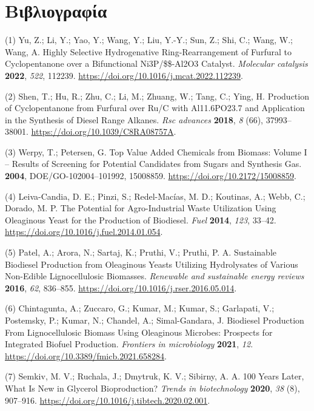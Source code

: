 \documentclass[11pt]{article}
\begin{document}
\pagebreak

\section{Βιβλιογραφία}
\label{sec:org909f14a}
\hypertarget{citeproc_bib_item_1}{(1) Yu, Z.; Li, Y.; Yao, Y.; Wang, Y.; Liu, Y.-Y.; Sun, Z.; Shi, C.; Wang, W.; Wang, A. Highly Selective Hydrogenative Ring-Rearrangement of Furfural to Cyclopentanone over a Bifunctional Ni3P/\$\gamma\$-Al2O3 Catalyst. \textit{Molecular catalysis} \textbf{2022}, \textit{522}, 112239. \url{https://doi.org/10.1016/j.mcat.2022.112239}.}

\hypertarget{citeproc_bib_item_2}{(2) Shen, T.; Hu, R.; Zhu, C.; Li, M.; Zhuang, W.; Tang, C.; Ying, H. Production of Cyclopentanone from Furfural over Ru/C with Al11.6PO23.7 and Application in the Synthesis of Diesel Range Alkanes. \textit{Rsc advances} \textbf{2018}, \textit{8} (66), 37993–38001. \url{https://doi.org/10.1039/C8RA08757A}.}

\hypertarget{citeproc_bib_item_3}{(3) Werpy, T.; Petersen, G. Top Value Added Chemicals from Biomass: Volume I – Results of Screening for Potential Candidates from Sugars and Synthesis Gas. \textbf{2004}, DOE/GO-102004–101992, 15008859. \url{https://doi.org/10.2172/15008859}.}

\hypertarget{citeproc_bib_item_4}{(4) Leiva-Candia, D. E.; Pinzi, S.; Redel-Macías, M. D.; Koutinas, A.; Webb, C.; Dorado, M. P. The Potential for Agro-Industrial Waste Utilization Using Oleaginous Yeast for the Production of Biodiesel. \textit{Fuel} \textbf{2014}, \textit{123}, 33–42. \url{https://doi.org/10.1016/j.fuel.2014.01.054}.}

\hypertarget{citeproc_bib_item_5}{(5) Patel, A.; Arora, N.; Sartaj, K.; Pruthi, V.; Pruthi, P. A. Sustainable Biodiesel Production from Oleaginous Yeasts Utilizing Hydrolysates of Various Non-Edible Lignocellulosic Biomasses. \textit{Renewable and sustainable energy reviews} \textbf{2016}, \textit{62}, 836–855. \url{https://doi.org/10.1016/j.rser.2016.05.014}.}

\hypertarget{citeproc_bib_item_6}{(6) Chintagunta, A.; Zuccaro, G.; Kumar, M.; Kumar, S.; Garlapati, V.; Postemsky, P.; Kumar, N.; Chandel, A.; Simal-Gandara, J. Biodiesel Production From Lignocellulosic Biomass Using Oleaginous Microbes: Prospects for Integrated Biofuel Production. \textit{Frontiers in microbiology} \textbf{2021}, \textit{12}. \url{https://doi.org/10.3389/fmicb.2021.658284}.}

\hypertarget{citeproc_bib_item_7}{(7) Semkiv, M. V.; Ruchala, J.; Dmytruk, K. V.; Sibirny, A. A. 100 Years Later, What Is New in Glycerol Bioproduction? \textit{Trends in biotechnology} \textbf{2020}, \textit{38} (8), 907–916. \url{https://doi.org/10.1016/j.tibtech.2020.02.001}.}
\end{document}
